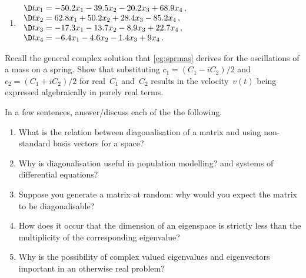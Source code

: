 \begin{exercise}
\begin{enumerate}
\item \(\begin{array}{l}
\D t{x_1}= -50.2x_1 -39.5x_2 -20.2x_3 +68.9x_4\,,\\
\D t{x_2}= 62.8x_1 +50.2x_2 +28.4x_3 -85.2x_4\,,\\
\D t{x_3}= -17.3x_1 -13.7x_2 -8.9x_3 +22.7x_4\,,\\
\D t{x_4}= -6.4x_1 -4.6x_2 -1.4x_3 +9x_4\,.
\end{array}\)
\setbox\ajrqrbox\hbox{}\marginpar{\usebox{\ajrqrbox}}%

\end{enumerate}
\end{exercise}





\begin{exercise} \label{ex:sprmas} 
Recall the general complex solution that \autoref{eg:sprmas} derives for the oscillations of a mass on a spring.
Show that substituting \(c_1=(C_1-iC_2)/2\) and \(c_2=(C_1+iC_2)/2\) for real~\(C_1\) and~\(C_2\) results in the velocity~\(v(t)\) being expressed algebraically in purely real terms.
\end{exercise}






\begin{exercise} 
In a few sentences, answer\slash discuss each of the the following.
\begin{enumerate}
\item What is the relation between diagonalisation of a matrix and using non-standard basis vectors for a space?

\item  Why is diagonalisation useful in population modelling? and systems of differential equations?

\item Suppose you generate a matrix at random: why would you expect the matrix to be diagonalisable?

\item How does it occur that the dimension of an eigenspace is strictly less than the multiplicity of the corresponding eigenvalue?

\item Why is the possibility of complex valued eigenvalues and eigenvectors important in an otherwise real problem?

\end{enumerate}
\end{exercise}

\begin{comment}
why, what caused X?
how did X occur?
what-if? what-if-not?
how does X compare with Y?
what is the evidence for X?
why is X important?

Add exercises on perhaps simple SIR models, and perhaps mechanical models.
\end{comment}




